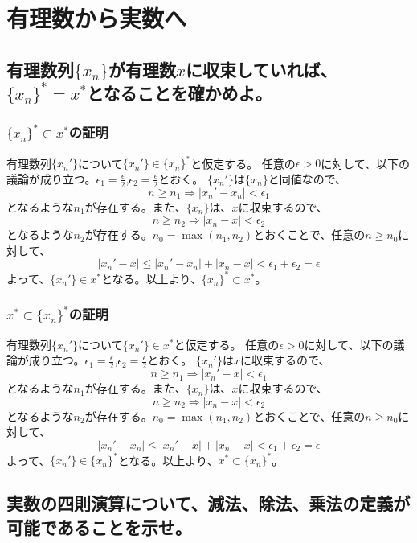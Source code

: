 \documentclass{jsarticle}
\begin{document}
\section{有理数から実数へ}
\subsection{有理数列$\{x_n\}$が有理数$x$に収束していれば、$\{x_n\}^*=x^*$となることを確かめよ。}
\subsubsection{$\{x_n\}^*\subset x^*$の証明}
有理数列$\{x_n'\}$について$\{x_n'\}\in\{x_n\}^*$と仮定する。
任意の$\epsilon>0$に対して、以下の議論が成り立つ。$\epsilon_1=\frac{\epsilon}{2}$,$\epsilon_2=\frac{\epsilon}{2}$とおく。
$\{x_n'\}$は$\{x_n\}$と同値なので、
\[n\geq n_1 \Longrightarrow|x_n'-x_n|<\epsilon_1\]
となるような$n_1$が存在する。また、$\{x_n\}$は、$x$に収束するので、
\[n\geq n_2 \Longrightarrow|x_n-x|<\epsilon_2\]
となるような$n_2$が存在する。$n_0=\max(n_1,n_2)$とおくことで、任意の$n\geq n_0$に対して、
\[|x_n'-x|\leq |x_n'-x_n|+|x_n-x| < \epsilon_1+\epsilon_2 =\epsilon\]
よって、$\{x_n'\}\in x^*$となる。以上より、$\{x_n\}^*\subset x^*$。

\subsubsection{$x^*\subset \{x_n\}^*$の証明}

有理数列$\{x_n'\}$について$\{x_n'\}\in x^*$と仮定する。
任意の$\epsilon>0$に対して、以下の議論が成り立つ。$\epsilon_1=\frac{\epsilon}{2}$,$\epsilon_2=\frac{\epsilon}{2}$とおく。
$\{x_n'\}$は$x$に収束するので、
\[n\geq n_1 \Longrightarrow|x_n'-x|<\epsilon_1\]
となるような$n_1$が存在する。また、$\{x_n\}$は、$x$に収束するので、
\[n\geq n_2 \Longrightarrow|x_n-x|<\epsilon_2\]
となるような$n_2$が存在する。$n_0=\max(n_1,n_2)$とおくことで、任意の$n\geq n_0$に対して、
\[|x_n'-x_n|\leq |x_n'-x|+|x_n-x| < \epsilon_1+\epsilon_2 =\epsilon\]
よって、$\{x_n'\}\in \{x_n\}^*$となる。以上より、$x^*\subset \{x_n\}^*$。



\subsection{実数の四則演算について、減法、除法、乗法の定義が可能であることを示せ。}
\end{document}
